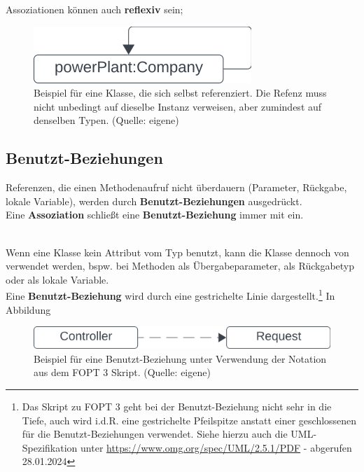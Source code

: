 \noindent
Assoziationen können auch \textbf{reflexiv} sein;


\begin{figure}
    \centering
    \includegraphics[scale=0.5]{chapters/fopt3/img/reflexive}
    \caption{Beispiel für eine Klasse, die sich selbst referenziert. Die Refenz muss nicht unbedingt auf dieselbe Instanz verweisen, aber zumindest auf denselben Typen. (Quelle: eigene)}
    \label{fig:reflexive}
\end{figure}


\subsection{Benutzt-Beziehungen}

\begin{tcolorbox}
    Referenzen, die einen Methodenaufruf nicht überdauern (Parameter, Rückgabe, lokale Variable), werden durch \textbf{Benutzt-Beziehungen} ausgedrückt.\\

    \noindent
    Eine \textbf{Assoziation} schließt eine \textbf{Benutzt-Beziehung} immer mit ein.
\end{tcolorbox}\\

\noindent
Wenn eine Klasse  kein Attribut vom Typ  benutzt, kann die Klasse  dennoch von  verwendet werden, bspw. bei Methoden als Übergabeparameter, als Rückgabetyp oder als lokale Variable.\\

\noindent
Eine \textbf{Benutzt-Beziehung} wird durch eine gestrichelte Linie dargestellt.\footnote{
Das Skript zu FOPT 3 geht bei der Benutzt-Beziehung nicht sehr in die Tiefe, auch wird i.d.R. eine gestrichelte Pfeilspitze anstatt einer geschlossenen für die Benutzt-Beziehungen verwendet. Siehe hierzu auch die UML-Spezifikation unter \url{https://www.omg.org/spec/UML/2.5.1/PDF} - abgerufen 28.01.2024
}
In Abbildung

\begin{figure}
    \centering
    \includegraphics[scale=0.5]{chapters/fopt3/img/uses}
    \caption{Beispiel für eine Benutzt-Beziehung unter Verwendung der Notation aus dem FOPT 3 Skript. (Quelle: eigene)}
    \label{fig:uses}
\end{figure}

